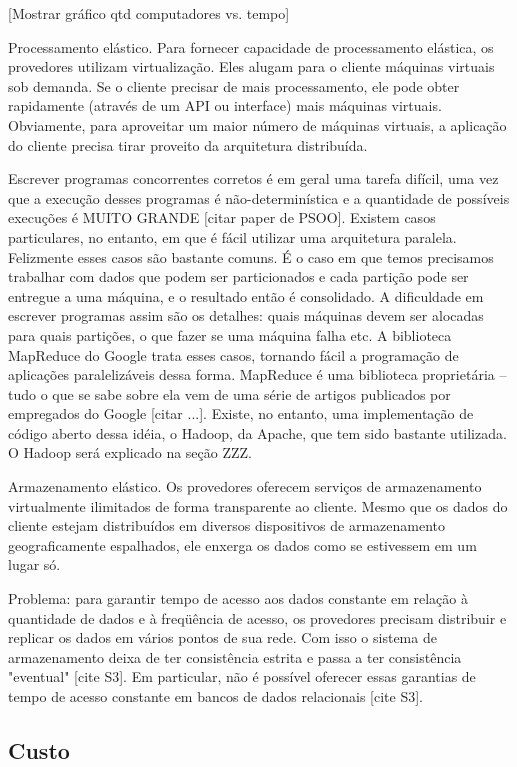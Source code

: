 [Mostrar gráfico qtd computadores vs. tempo]

Processamento elástico. Para fornecer capacidade de processamento elástica, os provedores utilizam virtualização. Eles alugam para o cliente máquinas virtuais sob demanda. Se o cliente precisar de mais processamento, ele pode obter rapidamente (através de um API ou interface) mais máquinas virtuais. Obviamente, para aproveitar um maior número de máquinas virtuais, a aplicação do cliente precisa tirar proveito da arquitetura distribuída.

Escrever programas concorrentes corretos é em geral uma tarefa difícil, uma vez que a execução desses programas é não-determinística e a quantidade de possíveis execuções é MUITO GRANDE [citar paper de PSOO]. Existem casos particulares, no entanto, em que é fácil utilizar uma arquitetura paralela. Felizmente esses casos são bastante comuns. É o caso em que temos precisamos trabalhar com dados que podem ser particionados e cada partição pode ser entregue a uma máquina, e o resultado então é consolidado. A dificuldade em escrever programas assim são os detalhes: quais máquinas devem ser alocadas para quais partições, o que fazer se uma máquina falha etc. A biblioteca MapReduce do Google trata esses casos, tornando fácil a programação de aplicações paralelizáveis dessa forma. MapReduce é uma biblioteca proprietária -- tudo o que se sabe sobre ela vem de uma série de artigos publicados por empregados do Google [citar ...]. Existe, no entanto, uma implementação de código aberto dessa idéia, o Hadoop, da Apache, que tem sido bastante utilizada. O Hadoop será explicado na seção ZZZ.

Armazenamento elástico. Os provedores oferecem serviços de armazenamento virtualmente ilimitados de forma transparente ao cliente. Mesmo que os dados do cliente estejam distribuídos em diversos dispositivos de armazenamento geograficamente espalhados, ele enxerga os dados como se estivessem em um lugar só.

Problema: para garantir tempo de acesso aos dados constante em relação à quantidade de dados e à freqüência de acesso, os provedores precisam distribuir e replicar os dados em vários pontos de sua rede. Com isso o sistema de armazenamento deixa de ter consistência estrita e passa a ter consistência "eventual" [cite S3]. Em particular, não é possível oferecer essas garantias de tempo de acesso constante em bancos de dados relacionais [cite S3].

\subsection{Custo}


